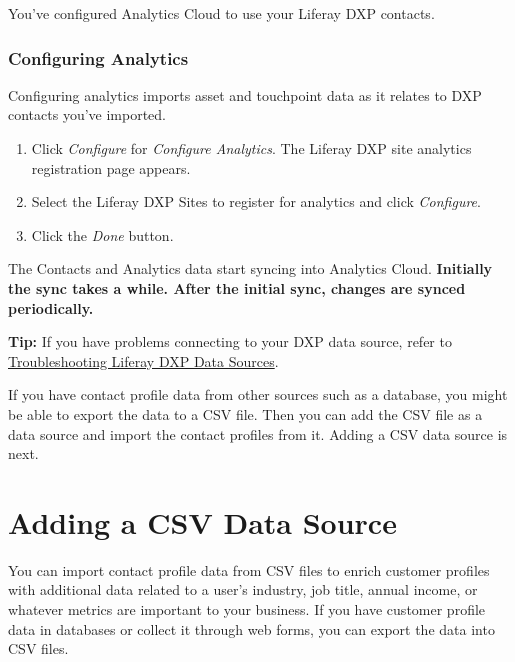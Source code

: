 You've configured Analytics Cloud to use your Liferay DXP contacts.

\subsubsection{Configuring Analytics}\label{configuring-analytics}

Configuring analytics imports asset and touchpoint data as it relates to
DXP contacts you've imported.

\begin{enumerate}
\def\labelenumi{\arabic{enumi}.}
\item
  Click \emph{Configure} for \emph{Configure Analytics}. The Liferay DXP
  site analytics registration page appears.
\item
  Select the Liferay DXP Sites to register for analytics and click
  \emph{Configure}.
\item
  Click the \emph{Done} button.
\end{enumerate}

The Contacts and Analytics data start syncing into Analytics Cloud.
\textbf{Initially the sync takes a while. After the initial sync,
changes are synced periodically.}

\noindent\hrulefill

\textbf{Tip:} If you have problems connecting to your DXP data source,
refer to
\href{https://github.com/liferay/liferay-docs/blob/7.1.x/discover/analytics-cloud/articles/06-troubleshooting/00-troubleshooting-data-sources-intro.markdown}{Troubleshooting
Liferay DXP Data Sources}.

\noindent\hrulefill

If you have contact profile data from other sources such as a database,
you might be able to export the data to a CSV file. Then you can add the
CSV file as a data source and import the contact profiles from it.
Adding a CSV data source is next.

\section{Adding a CSV Data Source}\label{adding-a-csv-data-source}

You can import contact profile data from CSV files to enrich customer
profiles with additional data related to a user's industry, job title,
annual income, or whatever metrics are important to your business. If
you have customer profile data in databases or collect it through web
forms, you can export the data into CSV files.


